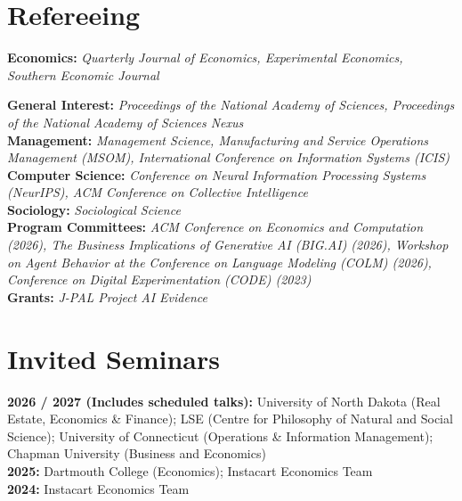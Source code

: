 \documentclass[margin,line,pifont,palatino,courier, 9pt]{res}
\begin{document}
\begin{resume}
\section{\sc Refereeing}
\textbf{Economics:} \textit{Quarterly Journal of Economics, Experimental Economics, Southern Economic Journal}

\textbf{General Interest:} \textit{Proceedings of the National Academy of Sciences, Proceedings of the National Academy of Sciences Nexus}\vspace{2mm}\\
\textbf{Management:} \textit{Management Science, Manufacturing and Service Operations Management (MSOM), International Conference on Information Systems (ICIS)}\vspace{2mm}\\
\textbf{Computer Science:} \textit{Conference on Neural Information Processing Systems (NeurIPS), ACM Conference on Collective Intelligence}\vspace{2mm}\\
\textbf{Sociology:} \textit{Sociological Science}\vspace{2mm}\\
\textbf{Program Committees:} \textit{ACM Conference on Economics and Computation (2026), The Business Implications of Generative AI (BIG.AI) (2026), Workshop on Agent Behavior at the Conference on Language Modeling (COLM) (2026), Conference on Digital Experimentation (CODE) (2023)}\vspace{2mm}\\
\textbf{Grants:} \textit{J-PAL Project AI Evidence}

\section{\sc Invited Seminars}
\textbf{2026 / 2027 (Includes scheduled talks):}
University of North Dakota (Real Estate, Economics \& Finance);
LSE (Centre for Philosophy of Natural and Social Science);
University of Connecticut (Operations \& Information Management);
Chapman University (Business and Economics)\vspace{2mm}\\
\textbf{2025:}
Dartmouth College (Economics);
Instacart Economics Team\vspace{2mm}\\
\textbf{2024:}
Instacart Economics Team


\end{resume}
\end{document}
